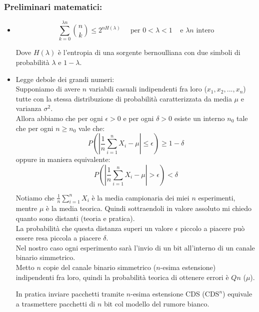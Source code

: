 \subsubsection*{Preliminari matematici:}
\begin{itemize}
	\item \begin{equation*}
	\sum_{k=0}^{\lambda n}\binom{n}{k} \leq 2^{nH(\lambda)} \; \; \; \;\; \text{per } 0 < \lambda < 1 \; \; \; \; \text{e } \lambda n \text{ intero}
	\end{equation*}
	
	Dove $H(\lambda)$ è l'entropia di una sorgente bernoulliana con due simboli di probabilità $\lambda$ e $1-\lambda$.
	
	\item Legge debole dei grandi numeri:\\
	Supponiamo di avere $n$ variabili casuali indipendenti fra loro ($x_1, x_2, ..., x_n$) tutte con la stessa distribuzione di probabilità caratterizzata da media $\mu$ e varianza $\sigma^2$.\\
	Allora abbiamo che per ogni $\epsilon > 0$ e per ogni $\delta> 0$ esiste un interno $n_0$ tale che per ogni $n\geq n_0$ vale che:
	\begin{equation*}
	P(|\frac1n\sum_{i=1}^nX_i-\mu| \leq \epsilon) \geq 1 - \delta
	\end{equation*}
	oppure in maniera equivalente:
	\begin{equation*}
	P(|\frac1n\sum_{i=1}^nX_i-\mu| > \epsilon) < \delta
	\end{equation*}
	
	Notiamo che $\frac1n\sum_{i=1}^nX_i$ è la media campionaria dei miei $n$ esperimenti, mentre $\mu$ è la media teorica.
	Quindi sottraendoli in valore assoluto mi chiedo quanto sono distanti (teoria e pratica).\\
	La probabilità che questa distanza superi un valore $\epsilon$ piccolo a piacere può essere resa piccola a piacere $\delta$.\\
	Nel nostro caso ogni esperimento sarà l'invio di un bit all'interno di un canale binario simmetrico.\\
	Metto $n$ copie del canale binario simmetrico ($n$-esima estensione) indipendenti fra loro, quindi la probabilità teorica di ottenere errori è $Qn$ ($\mu$).
	\smallskip
	
	In pratica inviare pacchetti tramite $n$-esima estensione CDS ($\text{CDS}^n$) equivale a trasmettere pacchetti di $n$ bit col modello del rumore bianco.\\
	

\end{itemize}
